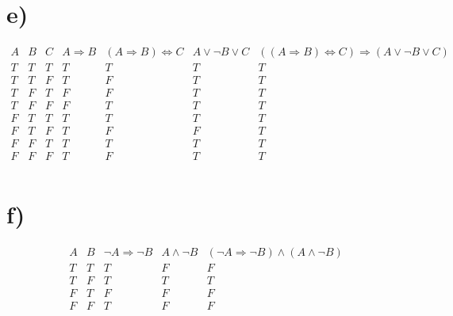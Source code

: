\documentclass{article}
\begin{document}
\section*{e)}
\begin{displaymath}
\begin{array}{|c|c|c|c|c|c|c|c}

A & 
B & 
C &
A \Rightarrow B & 
(A \Rightarrow B) \Leftrightarrow C &
A \vee \neg B \vee C &
((A \Rightarrow B) \Leftrightarrow C) \Rightarrow (A \vee \neg B \vee C)\\ %
\hline  %
T & T & T & T & T & T & T\\
T & T & F & T & F & T & T\\
T & F & T & F & F & T & T\\
T & F & F & F & T & T & T\\
F & T & T & T & T & T & T\\
F & T & F & T & F & F & T\\
F & F & T & T & T & T & T\\
F & F & F & T & F & T & T\\

\end{array}
\end{displaymath}

\section*{f)}
\begin{displaymath}
\begin{array}{|c|c|c|c|c|c}

A & 
B & 
\neg A \Rightarrow \neg B & 
A \wedge \neg B &
(\neg A \Rightarrow \neg B) \wedge (A \wedge \neg B)\\ %
\hline  %
T & T & T & F & F\\
T & F & T & T & T\\
F & T & F & F & F\\
F & F & T & F & F\\

\end{array}
\end{displaymath}
\end{document}
